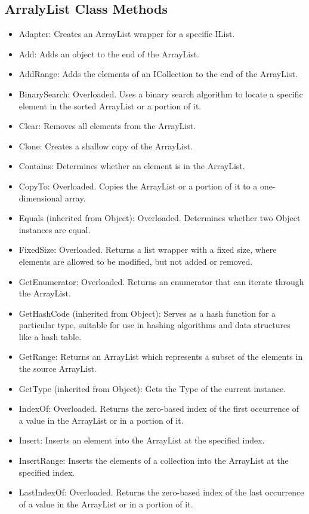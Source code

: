\documentclass[12pt,a4paper,final,twoside,titlepage]{book}
\begin{document}
\subsection{ArralyList Class Methods}
\begin{itemize}
\item Adapter: Creates an ArrayList wrapper for a specific IList.
\item Add: Adds an object to the end of the ArrayList.
\item AddRange: Adds the elements of an ICollection to the end of the ArrayList.
\item BinarySearch: Overloaded. Uses a binary search algorithm to locate a specific element in the sorted ArrayList or a portion of it.
\item Clear: Removes all elements from the ArrayList.
\item Clone: Creates a shallow copy of the ArrayList.
\item Contains: Determines whether an element is in the ArrayList.
\item CopyTo: Overloaded. Copies the ArrayList or a portion of it to a one-dimensional array.
\item Equals (inherited from Object): Overloaded. Determines whether two Object instances are equal.
\item FixedSize: Overloaded. Returns a list wrapper with a fixed size, where elements are allowed to be modified, but not added or removed.
\item GetEnumerator: Overloaded. Returns an enumerator that can iterate through the ArrayList.
\item GetHashCode (inherited from Object): Serves as a hash function for a particular type, suitable for use in hashing algorithms and data structures like a hash table.
\item GetRange: Returns an ArrayList which represents a subset of the elements in the source ArrayList.
\item GetType (inherited from Object): Gets the Type of the current instance.
\item IndexOf: Overloaded. Returns the zero-based index of the first occurrence of a value in the ArrayList or in a portion of it.
\item Insert: Inserts an element into the ArrayList at the specified index.
\item InsertRange: Inserts the elements of a collection into the ArrayList at the specified index.
\item LastIndexOf: Overloaded. Returns the zero-based index of the last occurrence of a value in the ArrayList or in a portion of it.

\end{itemize}
\end{document}
